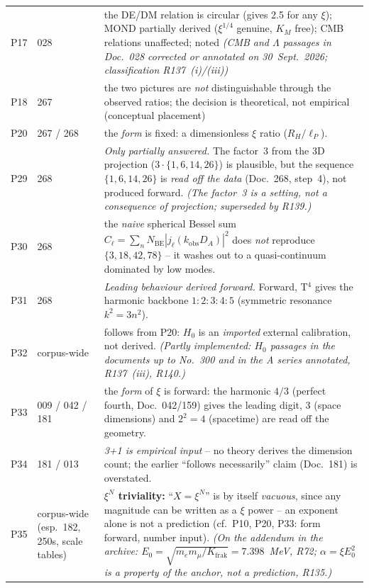 \begin{longtable}{@{}p{0.9cm}p{3.1cm}p{10.2cm}@{}}
P17 & 028 & the DE/DM relation is circular (gives 2.5 for any $\xi$); MOND partially derived ($\xi^{1/4}$ genuine, $K_M$ free); CMB relations unaffected; noted \emph{(CMB and $\Lambda$ passages in Doc.~028 corrected or annotated on 30~Sept.~2026; classification R137~(i)/(iii))} \\
P18 & 267 & the two pictures are \emph{not} distinguishable through the observed ratios; the decision is theoretical, not empirical (conceptual placement) \\
P20 & 267 / 268 & the \emph{form} is fixed: a dimensionless $\xi$ ratio ($R_H/\ell_P$). \\
P29 & 268 & \emph{Only partially answered.} The factor~3 from the 3D projection ($3\cdot\{1,6,14,26\}$) is plausible, but the sequence $\{1,6,14,26\}$ is \emph{read off the data} (Doc.~268, step~4), not produced forward. \emph{(The factor~3 is a setting, not a consequence of projection; superseded by R139.)} \\
P30 & 268 & the \emph{naive} spherical Bessel sum $C_\ell=\sum_n N_\mathrm{BE}|j_\ell(k_\mathrm{obs}D_A)|^2$ does \emph{not} reproduce $\{3,18,42,78\}$ -- it washes out to a quasi-continuum dominated by low modes. \\
P31 & 268 & \emph{Leading behaviour derived forward.} Forward, T$^4$ gives the harmonic backbone $1:2:3:4:5$ (symmetric resonance $k^2=3n^2$). \\
P32 & corpus-wide & follows from P20: $H_0$ is an \emph{imported} external calibration, not derived. \emph{(Partly implemented: $H_0$ passages in the documents up to No.~300 and in the A series annotated, R137~(iii), R140.)} \\
P33 & 009 / 042 / 181 & the \emph{form} of $\xi$ is forward: the harmonic $4/3$ (perfect fourth, Doc.~042/159) gives the leading digit, $3$ (space dimensions) and $2^2{=}4$ (spacetime) are read off the geometry. \\
P34 & 181 / 013 & \emph{3+1 is empirical input} -- no theory derives the dimension count; the earlier \enquote{follows necessarily} claim (Doc.~181) is overstated. \\
P35 & corpus-wide (esp.\ 182, 250s, scale tables) & \textbf{$\xi^N$ triviality:} \enquote{$X = \xi^N$} is by itself \emph{vacuous}, since any magnitude can be written as a $\xi$ power -- an exponent alone is not a prediction (cf.\ P10, P20, P33: form forward, number input). \emph{(On the addendum in the archive: $E_0=\sqrt{m_em_\mu/K_{\mathrm{frak}}}=7.398$~MeV, R72; $\alpha=\xi E_0^2$ is a property of the anchor, not a prediction, R135.)} \\

\end{longtable}
